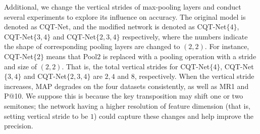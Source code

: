 \documentclass{article}
\begin{document}
Additional, we change the vertical strides of max-pooling layers and conduct several experiments to explore its influence on accuracy. The original model is denoted as CQT-Net, and the modified network is denoted as CQT-Net$\{4\}$, CQT-Net$\{3, 4\}$ and CQT-Net$\{2, 3, 4\}$ respectively, where the numbers indicate the shape of corresponding pooling layers are changed to $(2, 2)$. For instance, CQT-Net$\{2\}$ means that Pool$2$ is replaced with a pooling operation with a stride and size of $(2, 2)$. That is, the total vertical strides for CQT-Net$\{4\}$, CQT-Net$\{3, 4\}$ and CQT-Net$\{2, 3, 4\}$ are $2, 4$ and $8$, respectively. When the vertical stride increases, MAP degrades on the four datasets consistently, as well as MR1 and P@10. 
We suppose this is because the key transposition may shift one or two semitones; the network having a higher resolution of feature dimension (that is, setting vertical stride to be $1$) could capture these changes and help improve the precision. 
\end{document}
